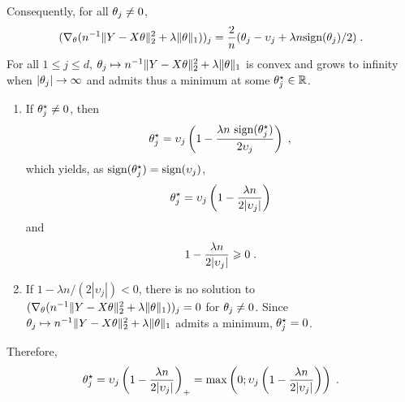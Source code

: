 Consequently, for all $\theta_j \neq 0$, 
\[
(\nabla_\theta ( n^{-1}\|Y - X\theta\|_2^2 +  \lambda\|\theta\|_1))_j= \frac{2}{n}( \theta_j - \upsilon_j + \lambda n\textrm{sign}(\theta_j)/2)\;.
\]
For all $1\leqslant j\leqslant d$,  $\theta_j \mapsto  n^{-1}\|Y - X\theta\|_2^2 + \lambda\|\theta\|_1$ is convex and grows to infinity when $|\theta_j|\to \infty$ and admits thus a minimum at some $\theta_j^{\star}\in\mathbb{R}$. 
\begin{enumerate}[-]
\item If $\theta_j^{\star} \neq 0$, then
\[
\theta_j^{\star} = \upsilon_j\left( 1 - \frac{\lambda n~\textrm{sign}(\theta_j^{\star})}{2 \upsilon_j}\right)\;,
\]
which yields, as  $\textrm{sign}(\theta_j^{\star}) = \textrm{sign}(\upsilon_j)$,
\[
\theta_j^{\star} = \upsilon_j\left(1 - \frac{\lambda n }{2 |\upsilon_j|}\right)
\]
and
\[
1 - \frac{\lambda n }{2 |\upsilon_j|} \geqslant 0\;.
\]
\item If $1 - \lambda n/(2 |\upsilon_j|)<0$, there is no solution to $(\nabla_\theta ( n^{-1}\|Y - X\theta\|_2^2 +  \lambda\|\theta\|_1))_j=0$ for $\theta_j \neq 0$.  Since $\theta_j \mapsto  n^{-1}\|Y - X\theta\|_2^2 + \lambda\|\theta\|_1$ admits a minimum, $\theta_j^{\star}=0$. 
\end{enumerate}
Therefore,
\[
\theta_j^{\star} = \upsilon_j\left( 1 - \frac{\lambda n}{2 |\upsilon_j|}\right)_+ = \mathrm{max}\left(0;\upsilon_j\left( 1 - \frac{\lambda n}{2 |\upsilon_j|}\right)\right)\;.
\]

